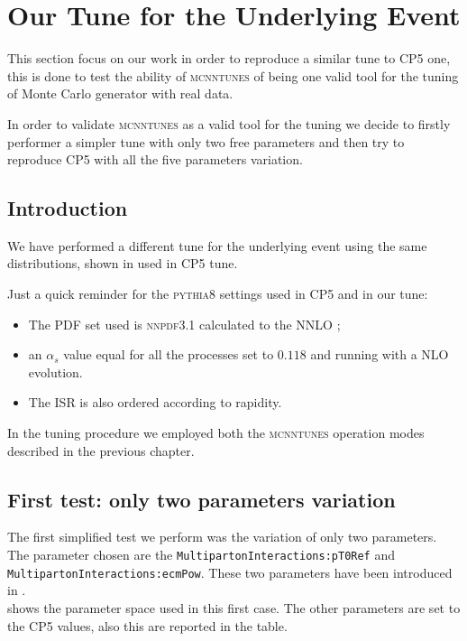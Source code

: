 \chapter{Our Tune for the Underlying Event}

This section focus on our work in order to reproduce a similar tune to CP5 one, this is done to test the ability of \textsc{mcnntunes} of being one valid tool for the tuning of Monte Carlo generator with real data. 

In order to validate \textsc{mcnntunes} as a valid tool for the tuning we decide to firstly performer a simpler tune with only two free parameters and then try to reproduce CP5 with all the five parameters variation.

\section{Introduction}

We have performed a different tune for the underlying event using the same distributions, shown in  used in CP5 tune.

Just a quick reminder for the \textsc{pythia8} settings used in CP5 and in our tune:
\begin{itemize}
	\item The PDF set used is \textsc{nnpdf}3.1 calculated to the NNLO \cite{NNPDF:2017mvq}; 
	\item an $\alpha_s$ value equal for all the processes set to $0.118$ and running with a NLO evolution.
	\item The ISR is also ordered according to rapidity.
\end{itemize}

In the tuning procedure we employed both the \textsc{mcnntunes} operation modes described in the previous chapter.

\section{First test: only two parameters variation}

The first simplified test we perform was the variation of only two parameters. The parameter chosen are the \texttt{MultipartonInteractions:pT0Ref} and \texttt{MultipartonInteractions:ecmPow}. These two parameters have been introduced in .
\\
 shows the parameter space used in this first case. The other parameters are set to the CP5 values, also this are reported in the table.

